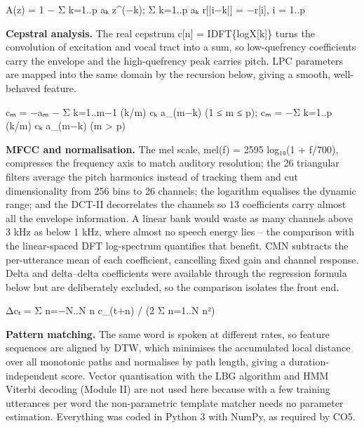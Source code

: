 \documentclass[
]{article}
\newenvironment{Shaded}{}{}
\newcommand{\NormalTok}[1]{#1}
\begin{document}
\begin{Shaded}
\begin{Highlighting}[]
\NormalTok{A(z) = 1 − Σ k=1..p aₖ z\^{}(−k);   Σ k=1..p aₖ r[|i−k|] = −r[i],  i = 1..p}
\end{Highlighting}
\end{Shaded}

\textbf{Cepstral analysis.} The real cepstrum c{[}n{]} =
IDFT\{log\textbar X{[}k{]}\textbar\} turns the convolution of excitation
and vocal tract into a sum, so low-quefrency coefficients carry the
envelope and the high-quefrency peak carries pitch. LPC parameters are
mapped into the same domain by the recursion below, giving a smooth,
well-behaved feature.

\begin{Shaded}
\begin{Highlighting}[]
\NormalTok{cₘ = −aₘ − Σ k=1..m−1 (k/m) cₖ a\_(m−k) (1 ≤ m ≤ p);   cₘ = −Σ k=1..p (k/m) cₖ a\_(m−k) (m \textgreater{} p)}
\end{Highlighting}
\end{Shaded}

\textbf{MFCC and normalisation.} The mel scale, mel(f) = 2595 log₁₀(1 +
f/700), compresses the frequency axis to match auditory resolution; the
26 triangular filters average the pitch harmonics instead of tracking
them and cut dimensionality from 256 bins to 26 channels; the logarithm
equalises the dynamic range; and the DCT-II decorrelates the channels so
13 coefficients carry almost all the envelope information. A linear bank
would waste as many channels above 3 kHz as below 1 kHz, where almost no
speech energy lies -- the comparison with the linear-spaced DFT
log-spectrum quantifies that benefit. CMN subtracts the per-utterance
mean of each coefficient, cancelling fixed gain and channel response.
Delta and delta--delta coefficients were available through the
regression formula below but are deliberately excluded, so the
comparison isolates the front end.

\begin{Shaded}
\begin{Highlighting}[]
\NormalTok{Δcₜ = Σ n=−N..N n c\_(t+n) / (2 Σ n=1..N n²)}
\end{Highlighting}
\end{Shaded}

\textbf{Pattern matching.} The same word is spoken at different rates,
so feature sequences are aligned by DTW, which minimises the accumulated
local distance over all monotonic paths and normalises by path length,
giving a duration-independent score. Vector quantisation with the LBG
algorithm and HMM Viterbi decoding (Module II) are not used here because
with a few training utterances per word the non-parametric template
matcher needs no parameter estimation. Everything was coded in Python 3
with NumPy, as required by CO5.
\end{document}
